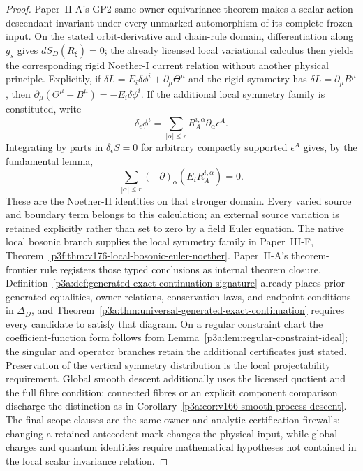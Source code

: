 \documentclass[12pt,a4paper]{article}
\begin{document}
\begin{proof}
Paper~II-A's GP2 same-owner equivariance theorem makes a scalar action
descendant invariant under every unmarked automorphism of its complete frozen
input. On the stated orbit-derivative and chain-rule domain, differentiation
along \(g_s\) gives \(dS_D(R_\xi)=0\); the already
licensed local variational calculus then yields the corresponding rigid
Noether-I current relation without another physical principle. Explicitly,
if $\delta L=E_i\delta\phi^i+\partial_\mu\Theta^\mu$ and the rigid
symmetry has $\delta L=\partial_\mu B^\mu$, then
$\partial_\mu(\Theta^\mu-B^\mu)=-E_i\delta\phi^i$. If the additional
local symmetry family is constituted, write
\[
 \delta_\epsilon\phi^i=
 \sum_{|\alpha|\le r}R_A^{i,\alpha}\partial_\alpha\epsilon^A.
\]
Integrating by parts in $\delta_\epsilon S=0$ for arbitrary compactly
supported $\epsilon^A$ gives, by the fundamental lemma,
\[
 \sum_{|\alpha|\le r}(-\partial)_\alpha
       (E_iR_A^{i,\alpha})=0.
\]
These are the Noether-II identities on that stronger domain. Every varied
source and boundary term belongs to this calculation; an external source
variation is retained explicitly rather than set to zero by a field Euler
equation. The native local bosonic branch supplies the local symmetry
family in Paper~III-F, Theorem~\ref{p3f:thm:v176-local-bosonic-euler-noether}.
Paper~II-A's theorem-frontier rule registers those typed conclusions as
internal theorem closure.  Definition~\ref{p3a:def:generated-exact-continuation-signature}
already places prior generated equalities, owner relations, conservation laws,
and endpoint conditions in \(\Delta_D\), and
Theorem~\ref{p3a:thm:universal-generated-exact-continuation} requires every
candidate to satisfy that diagram. On a regular constraint chart the
coefficient-function form follows from Lemma~\ref{p3a:lem:regular-constraint-ideal};
the singular and operator branches retain the additional certificates just
stated. Preservation of the vertical symmetry distribution is the local
projectability requirement. Global smooth descent additionally uses the
licensed quotient and the full fibre condition; connected fibres or an
explicit component comparison discharge the distinction as in
Corollary~\ref{p3a:cor:v166-smooth-process-descent}.  The final scope
clauses are the same-owner and analytic-certification firewalls: changing a
retained antecedent mark changes the physical input, while global charges and
quantum identities require mathematical hypotheses not contained in the
local scalar invariance relation.
\end{proof}
\end{document}
